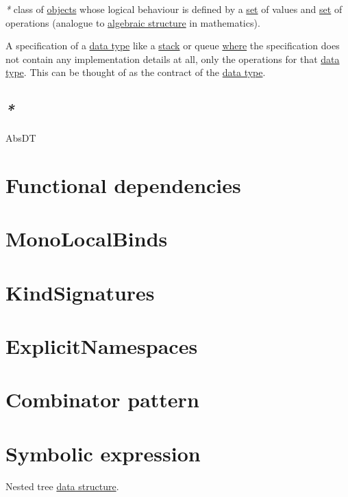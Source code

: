\documentclass[a4paper,14pt,oneside]{book}
\begin{document}
\emph{*} class of \hyperref[orge35d5e3]{objects} whose logical behaviour is defined by a \hyperref[org6aef0c5]{set} of values and \hyperref[org6aef0c5]{set} of operations (analogue to \hyperref[org87c4971]{algebraic structure} in mathematics).

A specification of a \hyperref[org996e822]{data type} like a \hyperref[org8132915]{stack} or queue \hyperref[orgb660a1e]{where} the specification does not contain any implementation details at all, only the operations for that \hyperref[org996e822]{data type}. This can be thought of as the contract of the \hyperref[org996e822]{data type}. 

\section{\emph{*}}
\label{sec:org264f0bd}

\label{org473a279}AbsDT

\chapter{\label{org68ec744}Functional dependencies}
\label{sec:orgbdc9929}

\chapter{\label{org75e6039}MonoLocalBinds}
\label{sec:org83c584d}

\chapter{\label{org4e9d115}KindSignatures}
\label{sec:org6c44057}

\chapter{\label{org89455c0}ExplicitNamespaces}
\label{sec:orge40b36a}

\chapter{\label{org5d19096}Combinator pattern}
\label{sec:org51ca58c}

\chapter{\label{org3e5a508}Symbolic expression}
\label{sec:orgdf07f04}
Nested tree \hyperref[orgfb47f6b]{data structure}.
\end{document}
